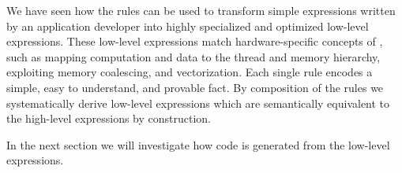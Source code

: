 We have seen how the rules can be used to transform simple expressions written by an application developer into highly specialized and optimized low-level \OpenCL expressions.
These low-level expressions match hardware-specific concepts of \OpenCL, such as mapping computation and data to the thread and memory hierarchy, exploiting memory coalescing, and vectorization.
Each single rule encodes a simple, easy to understand, and provable fact.
By composition of the rules we systematically derive low-level expressions which are semantically equivalent to the high-level expressions by construction.

In the next section we will investigate how \OpenCL code is generated from the low-level expressions.

